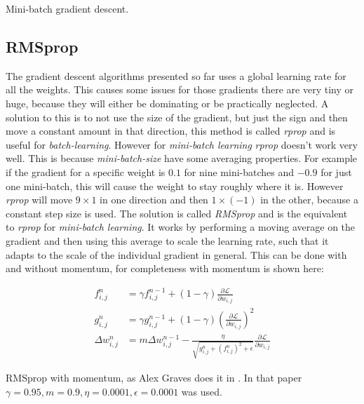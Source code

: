 \begin{algorithm}[h]
 \DontPrintSemicolon
 \caption{Mini-batch gradient descent.}
 \label{algorithm:gradientdescent:mini-batch}
\end{algorithm}

\subsection{RMSprop}

The gradient descent algorithms presented so far uses a global learning rate for all the weights. This causes some issues for those gradients there are very tiny or huge, because they will either be dominating or be practically neglected. A solution to this is to not use the size of the gradient, but just the sign and then move a constant amount in that direction, this method is called \textit{rprop} and is useful for \textit{batch-learning}. However for \textit{mini-batch learning} \textit{rprop} doesn't work very well. This is because \textit{mini-batch-size} have some averaging properties. For example if the gradient for a specific weight is $0.1$ for nine mini-batches and $-0.9$ for just one mini-batch, this will cause the weight to stay roughly where it is. However \textit{rprop} will move $9 \times 1$ in one direction and then $1 \times (-1)$ in the other, because a constant step size is used. The solution is called \textit{RMSprop} and is the equivalent to \textit{rprop} for \textit{mini-batch learning}. It works by performing a moving average on the gradient and then using this average to scale the learning rate, such that it adapts to the scale of the individual gradient in general. This can be done with and without momentum, for completeness with momentum is shown here:

\begin{equationbox}[H]
\begin{equation*}
\begin{aligned}
f_{i,j}^n &= \gamma f_{i,j}^{n-1} + (1 - \gamma) \frac{\partial \mathcal{L}}{\partial w_{i,j}} \\
g_{i,j}^n &= \gamma g_{i,j}^{n-1} + (1 - \gamma) \left(\frac{\partial \mathcal{L}}{\partial w_{i,j}}\right)^2 \\
\Delta w_{i,j}^n &= m \Delta w_{i,j}^{n-1} - \frac{\eta}{\sqrt{g_{i,j}^n + \left(f_{i,j}^n\right)^2 + \epsilon}} \frac{\partial \mathcal{L}}{\partial w_{i,j}}
\end{aligned}
\end{equation*}
\caption{RMSprop with momentum, as Alex Graves does it in \cite{graves-generating-sequences}. In that paper $\gamma = 0.95, m = 0.9, \eta = 0.0001, \epsilon = 0.0001$ was used.}
\end{equationbox}

